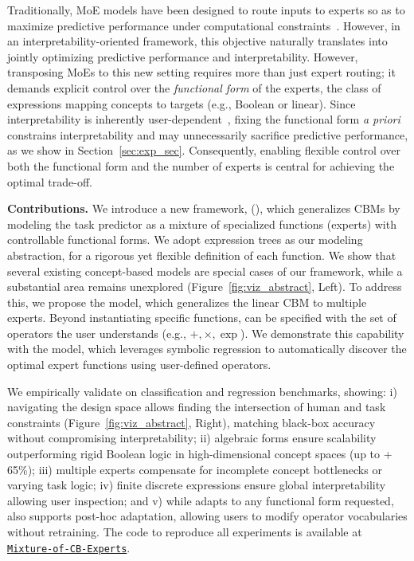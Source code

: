 \documentclass{article}
\theoremstyle{plain}
\theoremstyle{definition}
\theoremstyle{remark}
\newcommand{\mypar}[1]{\noindent\textbf{#1}}
\begin{document}
Traditionally, MoE models have been designed to route inputs to experts so as to maximize predictive performance under computational constraints~\citep{lepikhin2020gshard,artetxe2021efficient}. However, in an interpretability-oriented framework, this objective naturally translates into jointly optimizing predictive performance and interpretability.
However, transposing MoEs to this new setting requires more than just expert routing; it demands explicit control over the \emph{functional form} of the experts, the class of expressions mapping concepts to targets (e.g., Boolean or linear). Since interpretability is inherently user-dependent~\citep{lipton2018mythos,miller2019explanation,gkintoni2025challenging}, fixing the functional form \emph{a priori} constrains interpretability and may unnecessarily sacrifice predictive performance, as we show in Section~\ref{sec:exp_sec}. Consequently, enabling flexible control over both the functional form and the number of experts is central for achieving the optimal \ai{} trade-off.


\mypar{Contributions.}
We introduce a new framework, \class{} (\classacro), which generalizes CBMs by modeling the task predictor as a mixture of specialized functions (experts) with controllable functional forms. We adopt expression trees as our modeling abstraction, for a rigorous yet flexible definition of each function. 
We show that several existing concept-based models are special cases of our framework, while a substantial area remains unexplored (Figure~\ref{fig:viz_abstract}, Left). To address this, we propose the \linear{} model, which generalizes the linear CBM to multiple experts. 
Beyond instantiating specific functions, \classacro{} can be specified with the set of operators the user understands  (e.g., $+, \times, \exp$).
We demonstrate this capability with the \symbolic{} model, which leverages symbolic regression to automatically discover the optimal expert functions using user-defined operators. 

We empirically validate \classacro{} on classification and regression benchmarks, showing: i) navigating the design space allows finding the intersection of human and task constraints (Figure~\ref{fig:viz_abstract}, Right), matching black-box accuracy without compromising interpretability; ii) algebraic forms ensure scalability outperforming rigid Boolean logic in high-dimensional concept spaces (up to + 65\%); iii) multiple experts compensate for incomplete concept bottlenecks or varying task logic; iv) finite discrete expressions ensure global interpretability allowing user inspection; and v) while \classacro{} adapts to any functional form requested, \symbolic{} also supports post-hoc adaptation, allowing users to modify operator vocabularies without retraining. The code to reproduce all experiments is available at \href{https://github.com/francescoTheSantis/Mixture-of-CB-Experts}{\nolinkurl{Mixture-of-CB-Experts}}.
\end{document}
